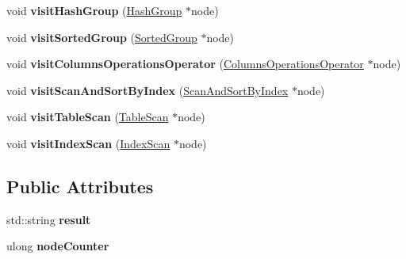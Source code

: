 \begin{DoxyCompactItemize}
\item 
\hypertarget{class_physical_operator_drawing_visitor_a6841170440f377c240a7c0a7af179a29}{void {\bfseries visit\+Hash\+Group} (\hyperlink{class_hash_group}{Hash\+Group} $\ast$node)}\label{class_physical_operator_drawing_visitor_a6841170440f377c240a7c0a7af179a29}

\item 
\hypertarget{class_physical_operator_drawing_visitor_a1c7736861639025a85d54867d7eeafca}{void {\bfseries visit\+Sorted\+Group} (\hyperlink{class_sorted_group}{Sorted\+Group} $\ast$node)}\label{class_physical_operator_drawing_visitor_a1c7736861639025a85d54867d7eeafca}

\item 
\hypertarget{class_physical_operator_drawing_visitor_ad1fb3f6d50ba14ad674a71e5f6c35d12}{void {\bfseries visit\+Columns\+Operations\+Operator} (\hyperlink{class_columns_operations_operator}{Columns\+Operations\+Operator} $\ast$node)}\label{class_physical_operator_drawing_visitor_ad1fb3f6d50ba14ad674a71e5f6c35d12}

\item 
\hypertarget{class_physical_operator_drawing_visitor_abf3323e213f5c7502e76b0d9afb9fe33}{void {\bfseries visit\+Scan\+And\+Sort\+By\+Index} (\hyperlink{class_scan_and_sort_by_index}{Scan\+And\+Sort\+By\+Index} $\ast$node)}\label{class_physical_operator_drawing_visitor_abf3323e213f5c7502e76b0d9afb9fe33}

\item 
\hypertarget{class_physical_operator_drawing_visitor_a709a44c2c02c9fc42d44fe3822c22f5b}{void {\bfseries visit\+Table\+Scan} (\hyperlink{class_table_scan}{Table\+Scan} $\ast$node)}\label{class_physical_operator_drawing_visitor_a709a44c2c02c9fc42d44fe3822c22f5b}

\item 
\hypertarget{class_physical_operator_drawing_visitor_a3d8f7b6bff44d79fb741b2709587f867}{void {\bfseries visit\+Index\+Scan} (\hyperlink{class_index_scan}{Index\+Scan} $\ast$node)}\label{class_physical_operator_drawing_visitor_a3d8f7b6bff44d79fb741b2709587f867}

\end{DoxyCompactItemize}
\subsection*{Public Attributes}
\begin{DoxyCompactItemize}
\item 
\hypertarget{class_physical_operator_drawing_visitor_a5663f7f6a5c8a6ad25d0c4c8f918123e}{std\+::string {\bfseries result}}\label{class_physical_operator_drawing_visitor_a5663f7f6a5c8a6ad25d0c4c8f918123e}

\item 
\hypertarget{class_physical_operator_drawing_visitor_a75aa4987d070c40a3ec2e4e9c950c9e0}{ulong {\bfseries node\+Counter}}\label{class_physical_operator_drawing_visitor_a75aa4987d070c40a3ec2e4e9c950c9e0}

\end{DoxyCompactItemize}


